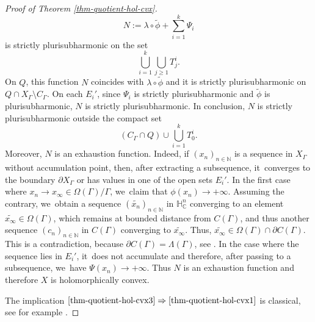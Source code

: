 \documentclass[JEP,XML,SOM,Unicode,NoEqCountersInSection,published]{cedram}
\theoremstyle{definition}
\newcommand{\C}{\mathbb{C}}
\newcommand{\N}{\mathbb{N}}
\newcommand{\HNC}{\mathbb{H}^{n}_{\C}}
\def\C{\mathbb{C}}
\newcommand{\HNC}{\mathbb{H}^{n}_{\C}}
\begin{document}
\begin{proof}[Proof of Theorem \ref{thm-quotient-hol-cvx}]
\begin{equation*}
N:= \lambda\circ\widetilde{\phi} + \sum_{i=1}^{k}\Psi_i
\end{equation*}
is strictly plurisubharmonic on the set
\begin{equation*}
\bigcup_{i=1}^{k}\bigcup_{j\ge1}T^{i}_{j}.
\end{equation*}
On $Q$, this function $N$ coincides with $\lambda\circ\widetilde{\phi}$ and it is strictly plurisubharmonic on \hbox{$Q\cap X_{\Gamma}\setminus C_{\Gamma}$}. On each $E_i'$, since $\Psi_i$ is strictly plurisubharmonic and $\widetilde{\phi}$ is plurisubharmonic, $N$ is strictly plurisubharmonic. In conclusion, $N$ is strictly plurisubharmonic outside the compact set
\begin{equation*}
(C_{\Gamma}\cap Q)\cup\bigcup_{i=1}^{k}T^{i}_{0}.
\end{equation*}
Moreover, $N$ is an exhaustion function. Indeed, if $(x_n)_{n\in \N}$ is a sequence in $X_{\Gamma}$ without accumulation point, then, after extracting a subsequence, it~converges to the boundary $\partial X_{\Gamma}$ or has values in one of the open sets $E_i'$. In the first case where $x_n \to x_{\infty}\in \Omega(\Gamma)/\Gamma$, we~claim that $\phi(x_n)\to +\infty$. Assuming the contrary, we~obtain a sequence $(\widetilde{x_n})_{n\in \N}$ in $\HNC$ converging to an element $\widetilde{x_{\infty}}\in \Omega(\Gamma)$, which remains at bounded distance from $C(\Gamma)$, and thus another sequence $(c_n)_{n\in \N}$ in $C(\Gamma)$ converging to $\widetilde{x_{\infty}}$. Thus, $\widetilde{x_{\infty}}\in \Omega(\Gamma) \cap \partial C(\Gamma)$. This is a contradiction, because $\partial C(\Gamma)=\Lambda(\Gamma)$, see \cite{andersonDirichletProblemInfinity1983}. In the case where the sequence lies in $E_i'$, it~does not accumulate and therefore, after passing to a subsequence, we~have $\Psi(x_n)\to +\infty$. Thus $N$ is an exhaustion function and therefore $X$ is holomorphically convex.

The implication $\eqref{thm-quotient-hol-cvx3}\Rightarrow\eqref{thm-quotient-hol-cvx1}$ is classical, see for example \cite[Th.\,I.6.14]{demaillyComplexAnalyticDifferential-manuel}.
\end{proof}
\end{document}
